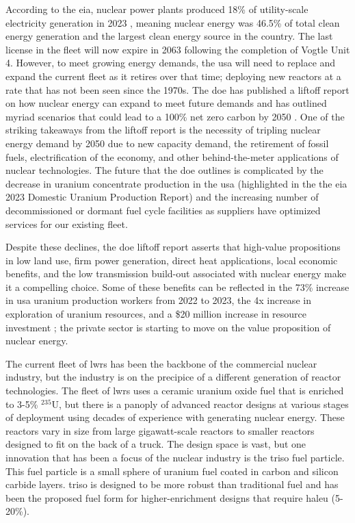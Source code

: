 According to the \gls{eia}, nuclear power plants produced 18\% of utility-scale
electricity generation in 2023 \cite{eia_elec_gen_2024}, meaning nuclear energy
was 46.5\% of total clean energy generation and the largest clean energy source
in the country. The last license in the fleet will now expire in 2063 following
the completion of Vogtle Unit 4. However, to meet growing energy demands,
the \gls{usa} will need to replace and expand the current fleet as it retires
over that time; deploying new reactors at a rate that has not been seen since
the 1970s. The \gls{doe} has published a liftoff report on how nuclear energy
can expand to meet future demands and has outlined myriad scenarios that could
lead to a 100\% net zero carbon by 2050 \cite{julie_liftoff_pathways_2024}. One
of the striking takeaways from the liftoff report is the necessity of tripling
nuclear energy demand by 2050 due to new capacity demand, the retirement of
fossil fuels, electrification of the economy, and other behind-the-meter
applications of nuclear technologies. The future that the \gls{doe} outlines is
complicated by the decrease in uranium concentrate production in the
\gls{usa} (highlighted in the the \gls{eia} 2023 Domestic Uranium Production
Report) and the increasing number of decommissioned or dormant fuel cycle
facilities \cite{eia_uranium_statistics_2023} as suppliers have optimized
services for our existing fleet.

Despite these declines, the \gls{doe} liftoff report asserts that
high-value propositions in low land use, firm power generation, direct heat
applications, local economic benefits, and the low transmission build-out
associated with nuclear energy make it a compelling choice. Some of these
benefits can be reflected in the 73\% increase in \gls{usa} uranium production
workers from 2022 to 2023, the 4x increase in exploration of uranium resources,
and a \$20 million increase in resource investment
\cite{eia_uranium_statistics_2023}; the private sector is starting to move on
the value proposition of nuclear energy.

The current fleet of \glspl{lwr} has been the backbone of the commercial nuclear
industry, but the industry is on the precipice of a different generation of
reactor technologies. The fleet of \glspl{lwr} uses a ceramic uranium oxide fuel
that is enriched to 3-5\% $^{235}$U, but there is a panoply of advanced reactor
designs at various stages of deployment using decades of experience with
generating nuclear energy. These reactors vary in size from large
gigawatt-scale reactors to smaller reactors designed to fit on the back of a
truck. The design space is vast, but one innovation that has been a focus of
the nuclear industry is the \gls{triso} fuel particle. This fuel particle is a
small sphere of uranium fuel coated in carbon and silicon carbide layers.
\gls{triso} is designed to be more robust than traditional fuel and has been the proposed fuel form for higher-enrichment designs that require \gls{haleu} (5-20\%).

